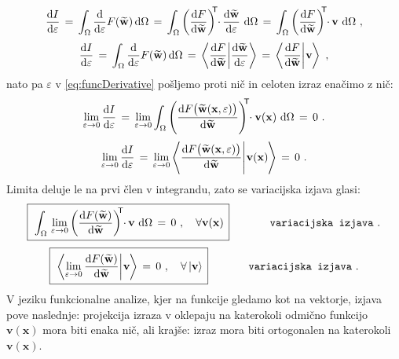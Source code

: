 \begin{equation*}
	\frac{\mathrm{d} I}{\mathrm{d} \varepsilon} \,
	=
	\, \int_{\Omega} \frac{\mathrm{d}}{\mathrm{d} \varepsilon} F(\widetilde{\mathbf{w}}) \, \mathrm{d} \Omega \,
	=
	\, \int_{\Omega} \left(\frac{\mathrm{d} F}{\mathrm{d} \widetilde{\mathbf{w}}}\right)^\mathsf{\mkern-7mu T} \mkern-5mu \cdot \mkern-1mu \frac{\mathrm{d} \widetilde{\mathbf{w}}}{\mathrm{d} \varepsilon} \ \mathrm{d} \Omega \,
	=
	\, \int_{\Omega} \left(\frac{\mathrm{d} F}{\mathrm{d} \widetilde{\mathbf{w}}}\right)^\mathsf{\mkern-7mu T} \mkern-5mu \cdot \mkern-1mu \mathbf{v} \ \mathrm{d} \Omega \ ,
\label{eq:funcDerivative}
\end{equation*}
\begin{equation*}
	\frac{\mathrm{d} I}{\mathrm{d} \varepsilon} \,
	=
	\, \int_{\Omega} \frac{\mathrm{d}}{\mathrm{d} \varepsilon} F(\widetilde{\mathbf{w}}) \, \mathrm{d} \Omega \,
	=
	\, \bra{\frac{\mathrm{d} F}{\mathrm{d} \widetilde{\mathbf{w}}}}\ket{\frac{\mathrm{d} \widetilde{\mathbf{w}}}{\mathrm{d} \varepsilon}} \,
	=
	\, \bra{\frac{\mathrm{d} F}{\mathrm{d} \widetilde{\mathbf{w}}}}\ket{\mkern1mu \mathbf{v} \mkern-1mu} \ ,
\label{eq:funcDerivative}
\end{equation*}
nato pa $\varepsilon$ v \eqref{eq:funcDerivative} pošljemo proti nič in celoten izraz enačimo z nič:
\begin{equation*}
	\lim_{\varepsilon \rightarrow 0} \frac{\mathrm{d} I}{\mathrm{d} \varepsilon} \,
	=
	\, \lim_{\varepsilon \rightarrow 0} \int_{\Omega} \left(\frac{\mathrm{d} F\big(\widetilde{\mathbf{w}}(\mathbf{x}, \varepsilon)\big)}{\mathrm{d} \widetilde{\mathbf{w}}}\right)^\mathsf{\mkern-7mu T} \mkern-5mu \cdot \mathbf{v(\mathbf{x})} \ \mathrm{d} \Omega \,
	=
	\, 0 \ .
\end{equation*}
\begin{equation*}
	\lim_{\varepsilon \rightarrow 0} \frac{\mathrm{d} I}{\mathrm{d} \varepsilon} \,
	=
	\, \lim_{\varepsilon \rightarrow 0} \bra{\frac{\mathrm{d} F\big(\widetilde{\mathbf{w}}(\mathbf{x}, \varepsilon)\big)}{\mathrm{d} \widetilde{\mathbf{w}}}}\ket{\mkern1mu \mathbf{v(\mathbf{x})} \mkern-1mu} \,
	=
	\, 0 \ .
\end{equation*}
Limita deluje le na prvi člen v integrandu, zato se variacijska izjava glasi:
\begin{equation}
	\boxed{\, \vphantom{\bigg)^2_3}
		\int_{\Omega} \, \lim_{\varepsilon \rightarrow 0} \left(\frac{\ud F(\widetilde{\mathbf{w}})}{\ud \widetilde{\mathbf{w}}} \right)^\mathsf{\mkern-7mu T} \mkern-5mu \cdot \mkern-1mu \mathbf{v} \ \ud \Omega \, = \, 0 \ , \quad \forall \mathbf{v(\mathbf{x})}\,
	}
	\hspace{1.3cm} \texttt{variacijska izjava} \ .
	\label{eq:variationalStatement}
\end{equation}
\begin{equation}
	\boxed{\, \vphantom{\bigg)^2_3}
		\bra{\lim_{\varepsilon \rightarrow 0} \frac{\mathrm{d} F(\widetilde{\mathbf{w}})}{\mathrm{d} \widetilde{\mathbf{w}}}}\ket{\mkern1mu \mathbf{v} \mkern-1mu} \, = \, 0 \ , \quad \forall \ket{\mathbf{v}}\,
	}
	\hspace{1.3cm} \texttt{variacijska izjava} \ .
	\label{eq:variationalStatement}
\end{equation}
V jeziku funkcionalne analize, kjer na funkcije gledamo kot na vektorje, izjava pove naslednje: projekcija izraza v oklepaju na katerokoli odmično funkcijo $\mathbf{v(x)}$ mora biti enaka nič, ali krajše: izraz mora biti ortogonalen na katerokoli $\mathbf{v(x)}$.

